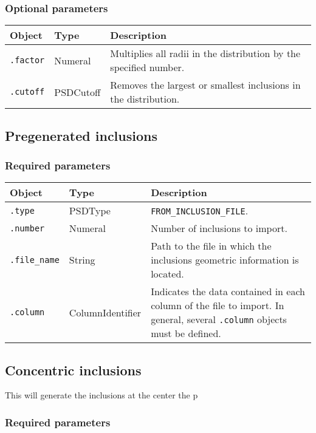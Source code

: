\documentclass[10pt]{article}
\begin{document}
\subsubsection*{Optional parameters}

\begin{tabularx}{\textwidth}{llX}
\hline 
Object & Type & Description \\ 
\hline 
\verb+.factor+ & Numeral & Multiplies all radii in the distribution by the specified number. \\ 
\verb+.cutoff+ & PSDCutoff & Removes the largest or smallest inclusions in the distribution. \\ 
\hline 
\end{tabularx}

\subsection{Pregenerated inclusions}

\subsubsection*{Required parameters}

\begin{tabularx}{\textwidth}{llX}
\hline 
Object & Type & Description \\ 
\hline 
\verb+.type+ & PSDType & \verb+FROM_INCLUSION_FILE+. \\ 
\verb+.number+ & Numeral & Number of inclusions to import. \\ 
\verb+.file_name+ & String & Path to the file in which the inclusions geometric information is located.\\ 
\verb+.column+ & ColumnIdentifier & Indicates the data contained in each column of the file to import. In general, several \verb+.column+ objects must be defined. \\ 
\hline 
\end{tabularx}

\subsection{Concentric inclusions}

This will generate the inclusions at the center the p%

\subsubsection*{Required parameters}
\end{document}
